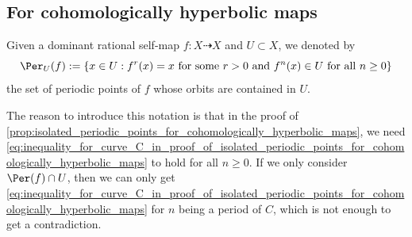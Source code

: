 \subsection{For cohomologically hyperbolic maps}

  Given a dominant rational self-map $f: X \dashrightarrow X$ and $U \subset X$, we denoted by
  \[ \Per_U(f) := \{x \in U: f^r(x) = x \text{ for some } r > 0 \text{ and } f^n(x) \in U \text{ for all } n \geq 0\} \]
  the set of periodic points of $f$ whose orbits are contained in $U$.

  \begin{remark}
    The reason to introduce this notation is that in the proof of \cref{prop:isolated_periodic_points_for_cohomologically_hyperbolic_maps}, we need \cref{eq:inequality_for_curve_C_in_proof_of_isolated_periodic_points_for_cohomologically_hyperbolic_maps} to hold for all $n \geq 0$.
    If we only consider $\Per(f) \cap U$, then we can only get \cref{eq:inequality_for_curve_C_in_proof_of_isolated_periodic_points_for_cohomologically_hyperbolic_maps} for $n$ being a period of $C$, which is not enough to get a contradiction.
  \end{remark}

